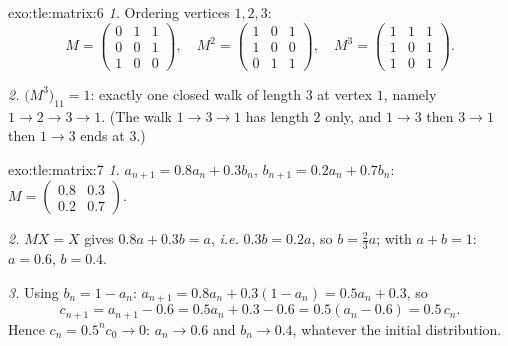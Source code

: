 \begin{solution}{exo:tle:matrix:6}
\emph{1.} Ordering vertices $1, 2, 3$:
\[
M = \begin{pmatrix} 0&1&1\\ 0&0&1\\ 1&0&0\end{pmatrix}, \quad
M^2 = \begin{pmatrix} 1&0&1\\ 1&0&0\\ 0&1&1\end{pmatrix}, \quad
M^3 = \begin{pmatrix} 1&1&1\\ 1&0&1\\ 1&0&1 \end{pmatrix}.
\]

\emph{2.} $\bigl(M^3\bigr)_{11} = 1$: exactly one closed walk of length $3$
at vertex $1$, namely $1 \to 2 \to 3 \to 1$. (The walk
$1 \to 3 \to 1$ has length $2$ only, and $1 \to 3$ then $3\to1$ then
$1\to3$ ends at $3$.)
\end{solution}

\begin{solution}{exo:tle:matrix:7}
\emph{1.} $a_{n+1} = 0.8a_n + 0.3b_n$, $b_{n+1} = 0.2a_n + 0.7b_n$:
$M = \begin{pmatrix} 0.8 & 0.3\\ 0.2 & 0.7\end{pmatrix}$.

\emph{2.} $MX = X$ gives $0.8a + 0.3b = a$, \emph{i.e.} $0.3b = 0.2a$, so
$b = \frac23 a$; with $a + b = 1$: $a = 0.6$, $b = 0.4$.

\emph{3.} Using $b_n = 1 - a_n$:
$a_{n+1} = 0.8a_n + 0.3(1 - a_n) = 0.5a_n + 0.3$, so
\[
c_{n+1} = a_{n+1} - 0.6 = 0.5a_n + 0.3 - 0.6 = 0.5(a_n - 0.6) = 0.5\,c_n .
\]
Hence $c_n = 0.5^n c_0 \to 0$: $a_n \to 0.6$ and $b_n \to 0.4$, whatever the
initial distribution.
\end{solution}

